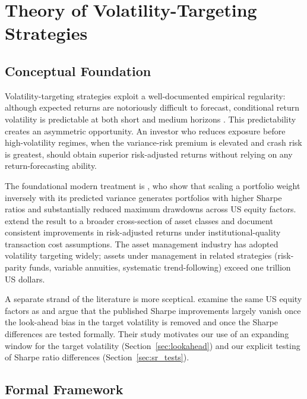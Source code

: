 \documentclass[12pt, a4paper]{article}
\begin{document}
\tableofcontents
\clearpage

\section{Theory of Volatility-Targeting Strategies}
\label{sec:theory}

\subsection{Conceptual Foundation}

Volatility-targeting strategies exploit a well-documented empirical regularity: although
expected returns are notoriously difficult to forecast, conditional return volatility is
predictable at both short and medium horizons \citep{Andersen2003}. This predictability
creates an asymmetric opportunity. An investor who reduces exposure before high-volatility
regimes, when the variance-risk premium is elevated and crash risk is greatest, should
obtain superior risk-adjusted returns without relying on any return-forecasting ability.

The foundational modern treatment is \citet{Moreira2017}, who show that scaling a
portfolio weight inversely with its predicted variance generates portfolios with higher
Sharpe ratios and substantially reduced maximum drawdowns across US equity factors.
\citet{Harvey2018} extend the result to a broader cross-section of asset classes and
document consistent improvements in risk-adjusted returns under institutional-quality
transaction cost assumptions. The asset management industry has adopted volatility
targeting widely; assets under management in related strategies (risk-parity funds,
variable annuities, systematic trend-following) exceed one trillion US dollars.

A separate strand of the literature is more sceptical. \citet{Liu2019} examine the same
US equity factors as \citet{Moreira2017} and argue that the published Sharpe improvements
largely vanish once the look-ahead bias in the target volatility is removed and once the
Sharpe differences are tested formally. Their study motivates our use of an expanding
window for the target volatility (Section~\ref{sec:lookahead}) and our explicit testing of
Sharpe ratio differences (Section~\ref{sec:sr_tests}).

\subsection{Formal Framework}
\end{document}
